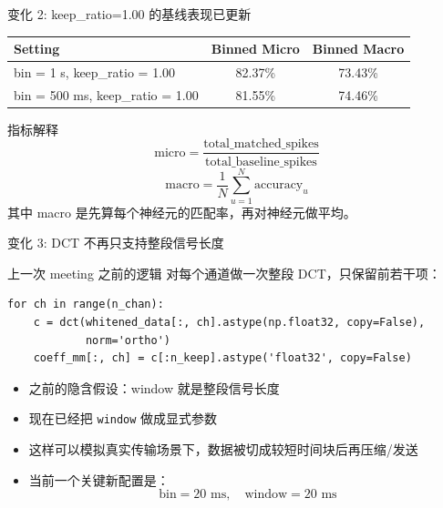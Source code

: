 \documentclass[aspectratio=169,11pt]{beamer}
\begin{document}
\begin{frame}{变化 2: keep\_ratio=1.00 的基线表现已更新}
  \small
  \begin{table}
    \centering
    \begin{tabular}{lcc}
      \toprule
      Setting & Binned Micro & Binned Macro \\
      \midrule
      bin = 1 s, keep\_ratio = 1.00 & 82.37\% & 73.43\% \\
      bin = 500 ms, keep\_ratio = 1.00 & 81.55\% & 74.46\% \\
      \bottomrule
    \end{tabular}
  \end{table}

  \vspace{0.4em}
  \begin{block}{指标解释}
    \[
      \text{micro}=\frac{\text{total\_matched\_spikes}}{\text{total\_baseline\_spikes}}
    \]
    \[
      \text{macro}=\frac{1}{N}\sum_{u=1}^{N}\text{accuracy}_{u}
    \]
    其中 macro 是先算每个神经元的匹配率，再对神经元做平均。
  \end{block}
\end{frame}

\begin{frame}[fragile]{变化 3: DCT 不再只支持整段信号长度}
  \small
  \begin{block}{上一次 meeting 之前的逻辑}
    对每个通道做一次整段 DCT，只保留前若干项：
    \begin{verbatim}
for ch in range(n_chan):
    c = dct(whitened_data[:, ch].astype(np.float32, copy=False),
            norm='ortho')
    coeff_mm[:, ch] = c[:n_keep].astype('float32', copy=False)
    \end{verbatim}
  \end{block}
  \begin{itemize}
    \item 之前的隐含假设：window 就是整段信号长度
    \item 现在已经把 \texttt{window} 做成显式参数
    \item 这样可以模拟真实传输场景下，数据被切成较短时间块后再压缩/发送
    \item 当前一个关键新配置是：
    \[
      \text{bin} = 20\text{ ms}, \quad \text{window} = 20\text{ ms}
    \]
  \end{itemize}
\end{frame}
\end{document}
